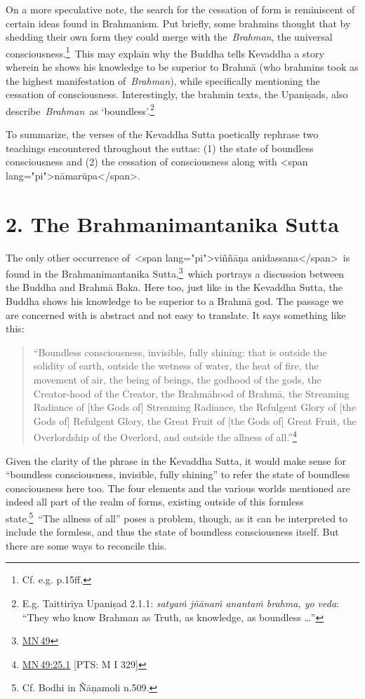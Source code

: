 \documentclass[10pt, openright]{book}
\begin{document}
On a more speculative note, the search for the cessation of form is reminiscent of certain ideas found in Brahmanism. Put briefly, some brahmins thought that by shedding their own form they could merge with the \textit{Brahman}, the universal consciousness.\footnote {Cf. e.g. \cite{Falk} p.15ff.} This may explain why the Buddha tells Kevaddha a story wherein he shows his knowledge to be superior to Brahmā (who brahmins took as the highest manifestation of \textit{Brahman}), while specifically mentioning the cessation of consciousness. Interestingly, the brahmin texts, the Upaniṣads, also describe \textit{Brahman} as ‘boundless’.\footnote {E.g. Taittirīya Upaniṣad 2.1.1: \textit{satyaṁ jñānaṁ anantaṁ brahma, yo veda}: “They who know Brahman as Truth, as knowledge, as boundless …”}


To summarize, the verses of the Kevaddha Sutta poetically rephrase two teachings encountered throughout the suttas: (1) the state of boundless consciousness and (2) the cessation of consciousness along with <span lang="pi">nāmarūpa</span>.


\chapter{2. The Brahmanimantanika Sutta}
The only other occurrence of <span lang="pi">viññāṇa anidassana</span> is found in the Brahmanimantanika Sutta,\footnote {\href{https://suttacentral.net/mn49/en/sujato}{MN 49}} which portrays a discussion between the Buddha and Brahmā Baka. Here too, just like in the Kevaddha Sutta, the Buddha shows his knowledge to be superior to a Brahmā god. The passage we are concerned with is abstract and not easy to translate. It says something like this:


\begin{quote}


“Boundless consciousness, invisible, fully shining: that is outside the solidity of earth, outside the wetness of water, the heat of fire, the movement of air, the being of beings, the godhood of the gods, the Creator-hood of the Creator, the Brahmāhood of Brahmā, the Streaming Radiance of [the Gods of] Streaming Radiance, the Refulgent Glory of [the Gods of] Refulgent Glory, the Great Fruit of [the Gods of] Great Fruit, the Overlordship of the Overlord, and outside the allness of all.”\footnote {\href{https://suttacentral.net/mn49/en/sujato\#25.1}{MN 49:25.1} [PTS: M I 329]}




\end{quote}
Given the clarity of the phrase in the Kevaddha Sutta, it would make sense for “boundless consciousness, invisible, fully shining” to refer the state of boundless consciousness here too. The four elements and the various worlds mentioned are indeed all part of the realm of forms, existing outside of this formless state.\footnote {Cf. Bodhi in Ñāṇamoli n.509.} “The allness of all” poses a problem, though, as it can be interpreted to include the formless, and thus the state of boundless consciousness itself. But there are some ways to reconcile this.
\end{document}
